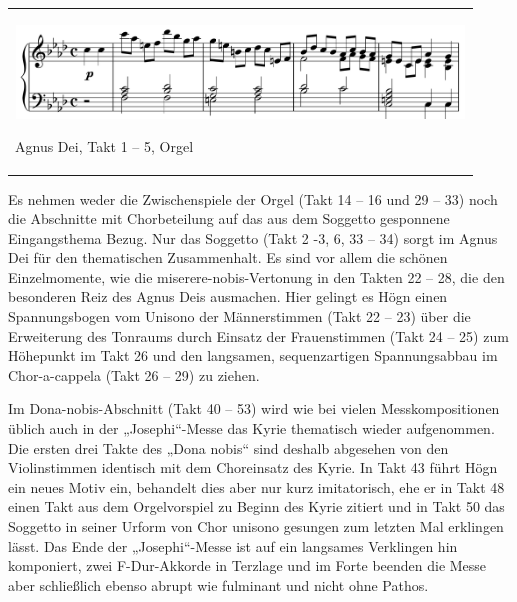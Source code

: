 \begin{center}
\tablefirsthead{}
\tablehead{}
\tabletail{}
\tablelasttail{}
\begin{supertabular}{m{12.107cm}}

\includegraphics[width=11.924cm,height=2.489cm]{pictures/zulassungsarbeit-img123.png}
\begin{figure}
\img{}
\caption{}
\end{figure}
Agnus Dei, Takt 1 – 5, Orgel\\
\end{supertabular}
\end{center}
Es nehmen weder die Zwischenspiele der Orgel (Takt 14 – 16 und 29 – 33)
noch die Abschnitte mit Chorbeteilung auf das aus dem Soggetto
gesponnene Eingangsthema Bezug. Nur das Soggetto (Takt 2 -3, 6, 33 –
34) sorgt im Agnus Dei für den thematischen Zusammenhalt. Es sind vor
allem die schönen Einzelmomente, wie die miserere-nobis-Vertonung in
den Takten 22 – 28, die den besonderen Reiz des Agnus Deis ausmachen.
Hier gelingt es Högn einen Spannungsbogen vom Unisono der Männerstimmen
(Takt 22 – 23) über die Erweiterung des Tonraums durch Einsatz der
Frauenstimmen (Takt 24 – 25) zum Höhepunkt im Takt 26 und den
langsamen, sequenzartigen Spannungsabbau im Chor-a-cappela (Takt 26 –
29) zu ziehen.

Im Dona-nobis-Abschnitt (Takt 40 – 53) wird wie bei vielen
Messkompositionen üblich auch in der „Josephi“-Messe das Kyrie
thematisch wieder aufgenommen. Die ersten drei Takte des „Dona nobis“
sind deshalb abgesehen von den Violinstimmen identisch mit dem
Choreinsatz des Kyrie. In Takt 43 führt Högn ein neues Motiv ein,
behandelt dies aber nur kurz imitatorisch, ehe er in Takt 48 einen Takt
aus dem Orgelvorspiel zu Beginn des Kyrie zitiert und in Takt 50 das
Soggetto in seiner Urform von Chor unisono gesungen zum letzten Mal
erklingen lässt. Das Ende der „Josephi“-Messe ist auf ein langsames
Verklingen hin komponiert, zwei F-Dur-Akkorde in Terzlage und im Forte
beenden die Messe aber schließlich ebenso abrupt wie fulminant und
nicht ohne Pathos.